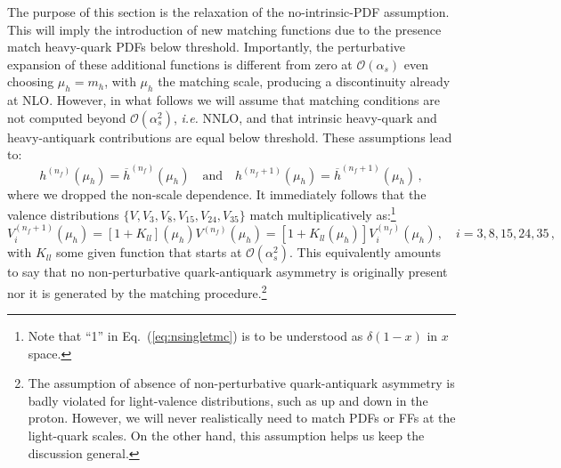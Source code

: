 \documentclass[10pt,a4paper]{article}
\begin{document}
The purpose of this section is the relaxation of the no-intrinsic-PDF
assumption. This will imply the introduction of new matching functions
due to the presence match heavy-quark PDFs below
threshold. Importantly, the perturbative expansion of these additional
functions is different from zero at $\mathcal{O}(\alpha_s)$ even
choosing $\mu_h=m_h$, with $\mu_h$ the matching scale, producing a
discontinuity already at NLO.  However, in what follows we will assume
that matching conditions are not computed beyond
$\mathcal{O}(\alpha_s^2)$, \textit{i.e.}  NNLO, and that intrinsic
heavy-quark and heavy-antiquark contributions are equal below
threshold. These assumptions lead to:
\begin{equation}
h^{(n_f)}(\mu_h) = \overline{h}^{(n_f)}(\mu_h)\quad\mbox{and}\quad h^{(n_f+1)}(\mu_h) = \overline{h}^{(n_f+1)}(\mu_h)\,,
\end{equation}
where we dropped the non-scale dependence. It immediately follows that
the valence distributions $\{V,V_3,V_8,V_{15},V_{24},V_{35}\}$ match
multiplicatively as:\footnote{Note that ``1'' in
  Eq.~(\ref{eq:nsingletmc}) is to be understood as $\delta(1-x)$ in
  $x$ space.}
\begin{equation}\label{eq:nsingletmc}
V_i^{(n_f+1)}(\mu_h) = [1+K_{ll}](\mu_h) V^{(n_f)}(\mu_h) = [1+K_{ll}(\mu_h)] V_i^{(n_f)}(\mu_h)\,,\quad i = 3,8,15,24,35\,,
\end{equation}
with $K_{ll}$ some given function that starts at
$\mathcal{O}(\alpha_s^2)$. This equivalently amounts to say that no
non-perturbative quark-antiquark asymmetry is originally present nor
it is generated by the matching procedure.\footnote{The assumption of
  absence of non-perturbative quark-antiquark asymmetry is badly
  violated for light-valence distributions, such as up and down in the
  proton. However, we will never realistically need to match PDFs or
  FFs at the light-quark scales. On the other hand, this assumption
  helps us keep the discussion general.}
\end{document}
